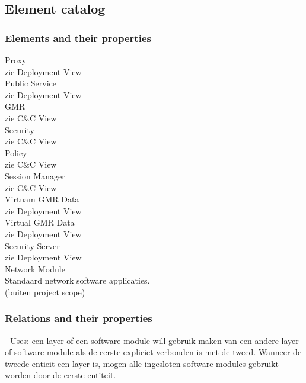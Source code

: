 \documentclass[a4paper,10pt]{article}
\begin{document}
\subsection{Element catalog}

\subsubsection{Elements and their properties}

Proxy\\
zie Deployment View\\

Public Service\\
zie Deployment View\\

GMR\\
zie C\&C View\\

Security\\
zie C\&C View\\

Policy\\
zie C\&C View\\

Session Manager\\
zie C\&C View\\

Virtuam GMR Data\\
zie Deployment View\\

Virtual GMR Data\\
zie Deployment View\\

Security Server\\
zie Deployment View\\

Network Module\\
Standaard network software applicaties.\\
(buiten project scope)\\


\subsubsection{Relations and their properties}

- Uses: een layer of een software module will gebruik maken van een andere layer of software module als de eerste expliciet verbonden is met de tweed. Wanneer de tweede entieit een layer is, mogen alle ingesloten software modules gebruikt worden door de eerste entiteit.\\
\end{document}
